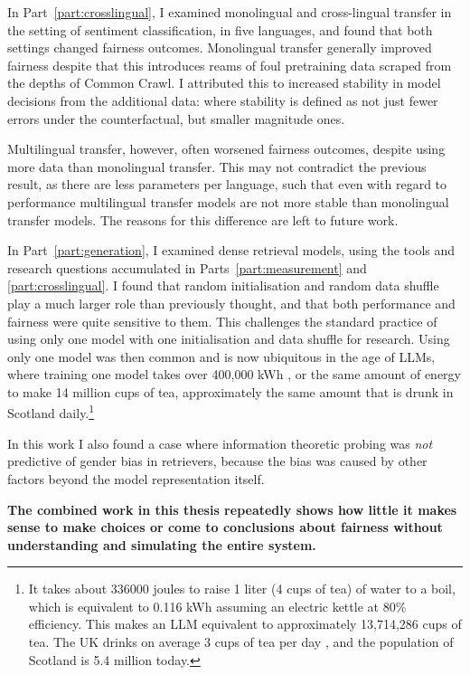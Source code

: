 In Part~\ref{part:crosslingual}, I examined monolingual and cross-lingual transfer in the setting of sentiment classification, in five languages, and found that both settings changed fairness outcomes. Monolingual transfer generally improved fairness despite that this introduces reams of foul pretraining data scraped from the depths of Common Crawl. I attributed this to increased stability in model decisions from the additional data: where stability is defined as not just fewer errors under the counterfactual, but smaller magnitude ones. 

Multilingual transfer, however, often worsened fairness outcomes, despite using more data than monolingual transfer. This may not contradict the previous result, as there are less parameters per language, such that even with regard to performance multilingual transfer models are not more stable than monolingual transfer models. The reasons for this difference are left to future work. 

In Part~\ref{part:generation}, I examined dense retrieval models, using the tools and research questions accumulated in Parts~\ref{part:measurement} and \ref{part:crosslingual}. I found that random initialisation and random data shuffle play a much larger role than previously thought, and that both performance and fairness were quite sensitive to them. This challenges the standard practice of using only one model with one initialisation and data shuffle for research. Using only one model was then common and is now ubiquitous in the age of LLMs, where training one model takes over 400,000 kWh \citep{luccioni_bloom_carbon}, or the same amount of energy to make 14 million cups of tea, approximately the same amount that is drunk in Scotland daily.\footnote{It takes about 336000 joules to raise 1 liter (4 cups of tea) of water to a boil, which is equivalent to 0.116 kWh assuming an electric kettle at 80\% efficiency. This makes an LLM equivalent to approximately 13,714,286 cups of tea. The UK drinks on average 3 cups of tea per day \citep{tea_stats}, and the population of Scotland is 5.4 million today.} 

In this work I also found a case where information theoretic probing was \textit{not} predictive of gender bias in retrievers, because the bias was caused by other factors beyond the model representation itself. 

\textbf{The combined work in this thesis repeatedly shows how little it makes sense to make choices or come to conclusions about fairness without understanding and simulating the entire system. }

